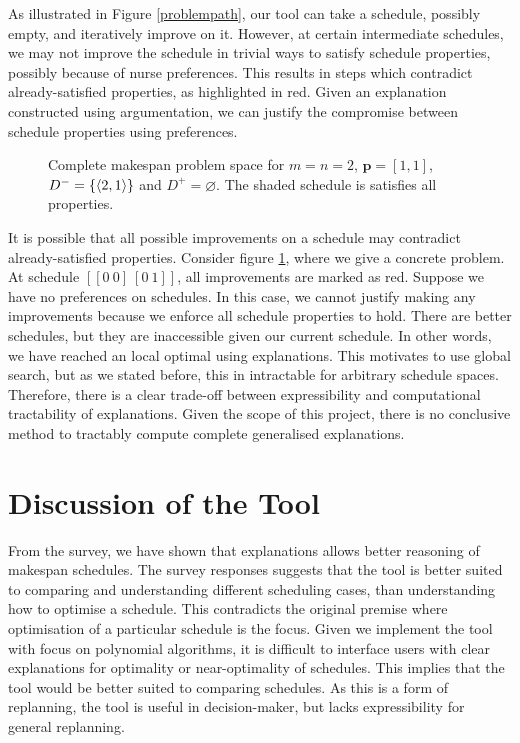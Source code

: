 As illustrated in Figure \ref{problempath}, our tool can take a schedule, possibly empty, and iteratively improve on it. However, at certain intermediate schedules, we may not improve the schedule in trivial ways to satisfy schedule properties, possibly because of nurse preferences. This results in steps which contradict already-satisfied properties, as highlighted in red. Given an explanation constructed using argumentation, we can justify the compromise between schedule properties using preferences.

\begin{figure}[H]
	\label{problemspace}
	
	\caption{Complete makespan problem space for $m=n=2$, $\mathbf{p}=[1,1]$, $D^-=\{\langle{2},{1}\rangle\}$ and $D^+=\varnothing$. The shaded schedule is satisfies all properties.}
\end{figure}

It is possible that all possible improvements on a schedule may contradict already-satisfied properties. Consider figure \ref{problemspace}, where we give a concrete problem. At schedule $[[0\ 0]\ [0\ 1]]$, all improvements are marked as red. Suppose we have no preferences on schedules. In this case, we cannot justify making any improvements because we enforce all schedule properties to hold. There are better schedules, but they are inaccessible given our current schedule. In other words, we have reached an local optimal using explanations. This motivates to use global search, but as we stated before, this in intractable for arbitrary schedule spaces. Therefore, there is a clear trade-off between expressibility and computational tractability of explanations. Given the scope of this project, there is no conclusive method to tractably compute complete generalised explanations.

\section{Discussion of the Tool}

From the survey, we have shown that explanations allows better reasoning of makespan schedules. The survey responses suggests that the tool is better suited to comparing and understanding different scheduling cases, than understanding how to optimise a schedule. This contradicts the original premise where optimisation of a particular schedule is the focus. Given we implement the tool with focus on polynomial algorithms, it is difficult to interface users with clear explanations for optimality or near-optimality of schedules. This implies that the tool would be better suited to comparing schedules. As this is a form of replanning, the tool is useful in decision-maker, but lacks expressibility for general replanning.

